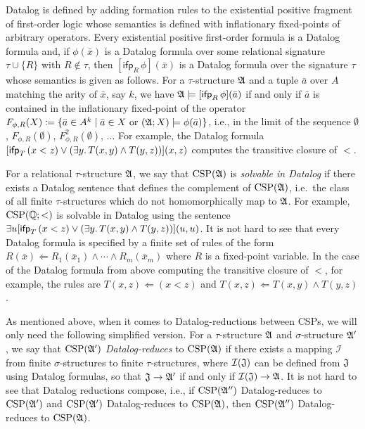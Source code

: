 Datalog is defined by adding formation rules to the existential positive fragment of first-order logic whose semantics is defined with inflationary fixed-points of arbitrary operators.  
%
Every existential positive first-order formula is a Datalog formula and, if $\phi(\bar{x})$ is a Datalog formula over some relational signature $\tau\cup \{R\}$ with $R\notin \tau$, then 
$[\mathsf{ifp}_{R}\,\phi](\bar{x})$ is a Datalog formula over the signature $\tau$ whose semantics is given as follows.
%
For a $\tau$-structure $\mathfrak{A}$ and a tuple $\bar{a}$ over $A$ matching the arity of $\bar{x}$, say $k$, we have $\mathfrak{A}\models [\mathsf{ifp}_{R}\, \phi](\bar{a})$ if and only if $\bar{a}$ is contained in the inflationary fixed-point of the operator $F_{\phi,R}(X) \mathrel{\mathop:}\mathrel{\mkern-1.2mu}= \{\bar{a}\in A^k \mid \bar{a}\in X \text{ or } (\mathfrak{A};X)\models \phi(\bar{a})\}$, i.e., in the limit of the sequence
%
$\emptyset$, $F_{\phi,R}(\emptyset)$, $F_{\phi,R}^2(\emptyset)$, $\dots$
%
For example, the Datalog formula $[\mathsf{ifp}_T\, (x<z) \vee (\exists y \ldotp T(x,y) \wedge T(y,z) )](x,z)$ computes the transitive closure of $<$. 

For a relational $\tau$-structure $\mathfrak{A}$, we say that $\mathrm{CSP}(\mathfrak{A})$ is \emph{solvable in Datalog} if there exists a Datalog sentence  that defines the complement of $\mathrm{CSP}(\mathfrak{A})$, i.e.~the class of all finite $\tau$-structures which do not homomorphically map to $\mathfrak{A}$.
%
For example, $\mathrm{CSP}(\mathbb{Q};<)$ is solvable in Datalog using the sentence $\exists u [\mathsf{ifp}_T\, (x<z) \vee (\exists y \ldotp T(x,y) \wedge T(y,z) )](u,u)$.
%
It is not hard to see that every Datalog formula is specified by a finite set of rules of the form $R(\bar{x})\Leftarrow R_1(\bar{x}_1)\wedge \cdots \wedge R_m(\bar{x}_m)$ where $R$ is a fixed-point variable.
%
In the case of the Datalog formula from above computing the transitive closure of $<$, for example,  the rules are $T(x,z) \Leftarrow (x<z)$ and $T(x,z) \Leftarrow T(x,y) \wedge T(y,z)$.

As mentioned above, when it comes to Datalog-reductions between CSPs, we will only need the following simplified version.
%
For a $\tau$-structure $\mathfrak{A}$ and $\sigma$-structure $\mathfrak{A'}$, we say that $\mathrm{CSP}(\mathfrak{A'})$ \emph{Datalog-reduces} to $\mathrm{CSP}(\mathfrak{A})$ if there exists a mapping $\mathcal{I}$ from finite $\sigma$-structures to finite $\tau$-structures, where $\mathcal{I}(\mathfrak{J})$ can be defined from $\mathfrak{J}$ using Datalog formulas, so that $\mathfrak{J} \rightarrow \mathfrak{A'}$ if and only if  $\mathcal{I}(\mathfrak{J}) \rightarrow \mathfrak{A}$.  
%
It is not hard to see that Datalog reductions compose, i.e., if $\mathrm{CSP}(\mathfrak{A}'')$ Datalog-reduces to $\mathrm{CSP}(\mathfrak{A}')$ and $\mathrm{CSP}(\mathfrak{A}')$ Datalog-reduces to $\mathrm{CSP}(\mathfrak{A})$, then $\mathrm{CSP}(\mathfrak{A}'')$ Datalog-reduces to $\mathrm{CSP}(\mathfrak{A})$.

